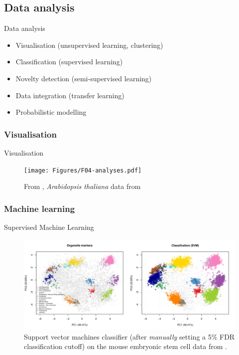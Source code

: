 \subsection*{Data analysis}
\label{sec:comp}


\begin{frame}{Data analysis}
  \begin{itemize}
  \item Visualisation (unsupervised learning, clustering) \citep{Gatto:2018}
  \item Classification (supervised learning) \citep{Breckels:2016b}
  \item Novelty detection (semi-supervised learning) \cite{Breckels:2013}
  \item Data integration (transfer learning) \citep{Breckels:2016}
  \item Probabilistic modelling \citep{Crook:2018}
  \end{itemize}
\end{frame}



\subsubsection*{Visualisation}
\label{sec:viz}

\begin{frame}{Visualisation}
  \begin{figure}
    \centering
    \texttt{[image: Figures/F04-analyses.pdf]}
    \caption{From \cite{Gatto:2010}, \textit{Arabidopsis thaliana} data
      from \cite{Dunkley:2006}}
  \end{figure}
\end{frame}

\subsubsection*{Machine learning}
\label{sec:ml}


\begin{frame}{Supervised Machine Learning}
  \begin{figure}[h]
    \centering
    \includegraphics[width=\linewidth]{figs_local/hyperlopit-class.pdf}
    \caption{Support vector machines classifier (after
      \textit{manually} setting a 5\% FDR classification cutoff) on
      the mouse embryonic stem cell data from
      \cite{Christoforou:2016}.}
  \end{figure}
\end{frame}


